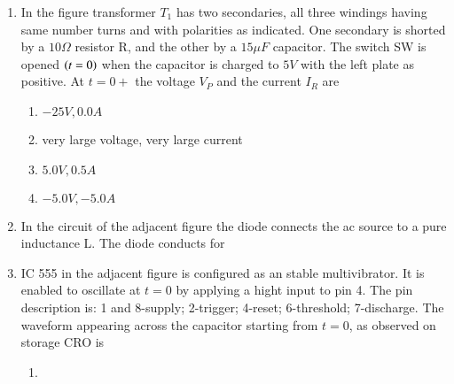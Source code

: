 \documentclass[journal]{IEEEtran}
\numberwithin{equation}{enumi}
\numberwithin{figure}{enumi}
\begin{document}
\begin{enumerate}
    \item 
    In the figure transformer $T_1$ has two secondaries, all three windings having same number turns and with polarities as indicated. One secondary is shorted by a $10\Omega$ resistor R, and the other by a $15 \mu F$ capacitor. The switch SW is opened $\left(t = 0\right)$ when  the capacitor is charged to $5 V$ with the left plate as positive. At $t = 0+$ the voltage $V_P$ and the current $I_R$ are
    \begin{figure}[H]
        \centering
        \resizebox{0.5\textwidth}{!}{}
    \end{figure}
    \hfill{}
    \begin{enumerate}
        \item $-25V, 0.0A$
        \item very large voltage, very large current
        \item $5.0V, 0.5A$
        \item $-5.0V, -5.0A$
    \end{enumerate}

    \item 
    In the circuit of the adjacent figure the diode connects the ac source to a pure inductance L.
    The diode conducts for
    \begin{figure}[H]
    \centering
    \resizebox{0.39\textwidth}{!}{}
    \end{figure}
    \hfill{}
    \begin{enumerate}
    \end{enumerate}

    \item 
    IC 555 in the adjacent figure is configured as an stable multivibrator. It is enabled to oscillate at $t = 0$ by applying a hight input to pin 4. The pin description is: 1 and 8-supply; 2-trigger; 4-reset; 6-threshold; 7-discharge. The waveform appearing across the capacitor starting from $t = 0$, as observed on storage CRO is
    \begin{figure}[H]
        \centering
        \resizebox{0.3\textwidth}{!}{}
    \end{figure}
    \hfill{}
    \begin{multicols}{2}
    \begin{enumerate}
        \item 
        \begin{figure}[H]
        \centering
        \resizebox{0.25\textwidth}{!}{}
        \end{figure}


\end{enumerate}
\end{multicols}
\end{enumerate}
\end{document}
